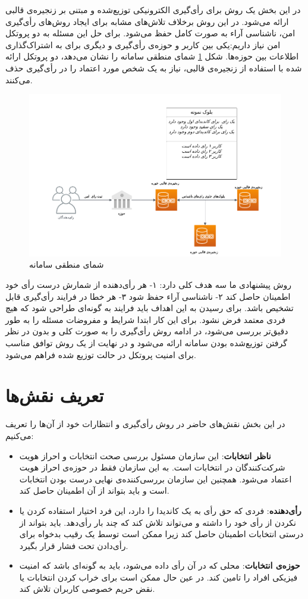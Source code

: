 در این بخش یک روش برای رأی‌گیری الکترونیکی توزیع‌شده و مبتنی بر زنجیره‌ی قالبی ارائه می‌شود. در این روش برخلاف تلاش‌های مشابه برای ایجاد روش‌های رأی‌گیری امن، ناشناسی آراء به صورت کامل حفظ می‌شود. برای حل این مسئله به دو پروتکل امن نیاز داریم:یکی بین کاربر و حوزه‌ی رأی‌گیری و دیگری برای به اشتراک‌گذاری اطلاعات بین حوزه‌ها. شکل \ref{fig:toplevel} شمای منطقی سامانه را نشان می‌دهد، دو پروتکل ارائه شده با استفاده از زنجیره‌ی قالبی، نیاز به یک شخص مورد اعتماد را در رأی‌گیری حذف می‌کنند.
\begin{figure}[h!]
	\centering
	\includegraphics[width=1\linewidth]{toplevel.png}
	\caption {شمای منطقی سامانه}
	\label{fig:toplevel}
\end{figure}


\par
روش پیشنهادی ما سه هدف کلی دارد: ۱- هر رأی‌دهنده از شمارش درست رأی خود اطمینان حاصل کند ۲- ناشناسی آراء حفظ شود ۳- هر خطا در فرایند رأی‌گیری قابل تشخیص باشد. برای رسیدن به این اهداف باید فرایند به گونه‌ای طراحی شود که هیچ فردی معتمد فرض نشود. برای این کار ابتدا شرایط و مفروضات مسئله را به طور دقیق‌تر بررسی می‌شود، در ادامه روش رأی‌گیری را به صورت کلی و بدون در نظر گرفتن توزیع‌شده بودن سامانه ارائه می‌شود و در نهایت از یک روش توافق مناسب برای امنیت پروتکل در حالت توزیع شده فراهم می‌شود. 
\section{تعریف نقش‌ها}
در این بخش نقش‌های حاضر در روش رأی‌گیری و انتظارات خود از آن‌ها را تعریف می‌کنیم:
\begin{itemize}
	\item
	\textbf{ناظر انتخابات}:
	این سازمان مسئول بررسی صحت انتخابات و احراز هویت شرکت‌کنندگان در انتخابات است. به این سازمان فقط در حوزه‌ی احراز هویت اعتماد می‌شود. همچنین این سازمان بررسی‌کننده‌ی نهایی درست بودن انتخابات است و باید بتواند از آن اطمینان حاصل کند.
	\item
	\textbf{رأی‌دهنده}:
	فردی که حق رأی به یک کاندیدا را دارد، این فرد اختیار استفاده کردن یا نکردن از رأی خود را داشته و می‌تواند تلاش کند که چند بار رأی‌دهد. باید بتواند از درستی انتخابات اطمینان حاصل کند زیرا ممکن است توسط یک رقیب بدخواه برای رأی‌دادن تحت فشار قرار بگیرد.
	\item
	\textbf{حوزه‌ی انتخابات}:
	محلی که در آن رأی داده می‌شود، باید به گونه‌ای باشد که امنیت فیزیکی افراد را تامین کند. در عین حال ممکن است برای خراب کردن انتخابات یا نقض حریم خصوصی کاربران تلاش کند. 
\end{itemize}
